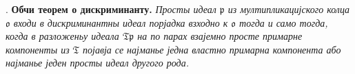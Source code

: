\documentclass[11pt]{article}
\newcommand{\mo}{\mathfrak{o}}
\newcommand{\mT}{\mathfrak{T}}
\newcommand{\mpideal}{\mathfrak{p}}
\begin{document}
\setcounter{footnote}{39}

. \textbf{Обчи теорем о дискриминанту.} \emph{Просты идеал $\mpideal$ из мултипликацијского колца $\mo$ входи в дискриминантны идеал порјадка взходно к $\mo$ тогда и само тогда, когда в разложеньу идеала $\mT\mpideal$ на по парах взајемно просте примарне компоненты из $\mT$ појавја се најманье једна властно примарна компонента або најманье једен просты идеал другого рода.}
\end{document}
